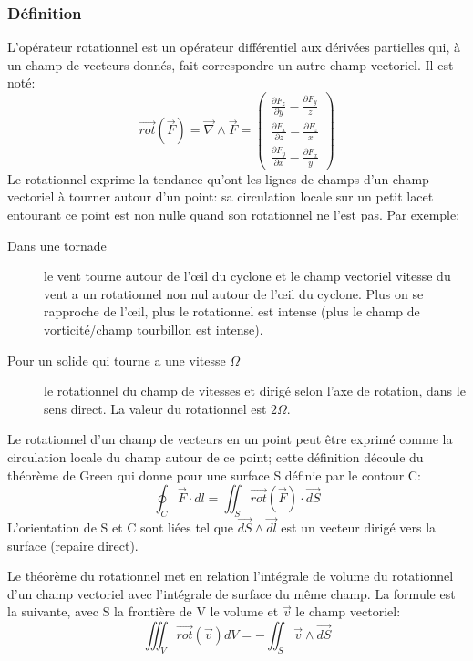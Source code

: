 \documentclass[10pt,a4paper]{article}
\begin{document}
\subsubsection{Définition}
L'opérateur rotationnel est un opérateur différentiel aux dérivées partielles qui, à un champ de vecteurs donnés, fait correspondre un autre champ vectoriel.
Il est noté:
\begin{equation}
\overrightarrow{rot}(\overrightarrow{F}) = \overrightarrow{\nabla} \land \overrightarrow{F} = 
\begin{pmatrix}
\frac{\partial F_{z}}{\partial y} - \frac{\partial F_{y}}{z} \\
\frac{\partial F_{x}}{\partial z} - \frac{\partial F_{z}}{x} \\
\frac{\partial F_{y}}{\partial x} - \frac{\partial F_{x}}{y}
\end{pmatrix}
\end{equation}
Le rotationnel exprime la tendance qu'ont les lignes de champs d'un champ vectoriel à tourner autour d'un point: sa circulation locale sur un petit lacet entourant ce point est non nulle quand son rotationnel ne l'est pas. Par exemple:
\begin{description}
\item[Dans une tornade] le vent tourne autour de l'œil du cyclone et le champ vectoriel vitesse du vent a un rotationnel non nul autour de l'œil du cyclone. Plus on se rapproche de l'œil, plus le rotationnel est intense (plus le champ de vorticité/champ tourbillon est intense).
\item[Pour un solide qui tourne a une vitesse $\Omega$] le rotationnel du champ de vitesses et dirigé selon l'axe de rotation, dans le sens direct. La valeur du rotationnel est $2\Omega$.
\end{description}

Le rotationnel d'un champ de vecteurs en un point peut être exprimé comme la circulation locale du champ autour de ce point; cette définition découle du théorème de Green qui donne pour une surface S définie par le contour C:
\begin{equation}
\oint_{C}\overrightarrow{F}\cdot dl = \iint_{S}\overrightarrow{rot}(\overrightarrow{F})\cdot \overrightarrow{dS}
\end{equation}
L'orientation de S et C sont liées tel que $\overrightarrow{dS}\land \overrightarrow{dl}$ est un vecteur dirigé vers la surface (repaire direct).

Le théorème du rotationnel met en relation l'intégrale de volume du rotationnel d'un champ vectoriel avec l'intégrale de surface du même champ. La formule est la suivante, avec S la frontière de V le volume et $\overrightarrow{v}$ le champ vectoriel:
\begin{equation}
\iiint_{V}\overrightarrow{rot}(\overrightarrow{v}) dV = - \iint_{S}\overrightarrow{v}\land \overrightarrow{dS}
\end{equation}
\end{document}
